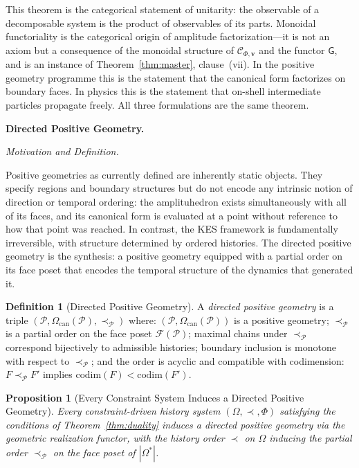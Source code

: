 \documentclass[11pt]{article}
\theoremstyle{plain}
\newtheorem{proposition}[theorem]{Proposition}
\theoremstyle{definition}
\newtheorem{definition}[theorem]{Definition}
\theoremstyle{remark}
\newcommand{\Phif}{\Phi}
\newcommand{\OmKS}{\Omega}
\newcommand{\CF}{\Omega_{\mathrm{can}}}
\newcommand{\Ccat}{\mathcal{C}_{\Phi,\mathbf{v}}}
\newcommand{\Gfun}{\mathsf{G}}
\begin{document}
This theorem is the categorical statement of unitarity: the observable of a decomposable system is the product of observables of its parts. Monoidal functoriality is the categorical origin of amplitude factorization---it is not an axiom but a consequence of the monoidal structure of $\Ccat$ and the functor $\Gfun$, and is an instance of Theorem~\ref{thm:master}, clause~(vii). In the positive geometry programme this is the statement that the canonical form factorizes on boundary faces. In physics this is the statement that on-shell intermediate particles propagate freely. All three formulations are the same theorem.

\bigskip\noindent\textbf{Directed Positive Geometry.}
\label{sec:directed}

\medskip\noindent\textit{Motivation and Definition.}

Positive geometries as currently defined are inherently static objects. They specify regions and boundary structures but do not encode any intrinsic notion of direction or temporal ordering: the amplituhedron exists simultaneously with all of its faces, and its canonical form is evaluated at a point without reference to how that point was reached. In contrast, the KES framework is fundamentally irreversible, with structure determined by ordered histories. The directed positive geometry is the synthesis: a positive geometry equipped with a partial order on its face poset that encodes the temporal structure of the dynamics that generated it.

\begin{definition}[Directed Positive Geometry]
\label{def:dpg}
A \emph{directed positive geometry} is a triple $(\mathcal{P}, \CF(\mathcal{P}), \prec_{\mathcal{P}})$ where: $(\mathcal{P}, \CF(\mathcal{P}))$ is a positive geometry; $\prec_{\mathcal{P}}$ is a partial order on the face poset $\mathcal{F}(\mathcal{P})$; maximal chains under $\prec_{\mathcal{P}}$ correspond bijectively to admissible histories; boundary inclusion is monotone with respect to $\prec_{\mathcal{P}}$; and the order is acyclic and compatible with codimension: $F \prec_{\mathcal{P}} F'$ implies $\mathrm{codim}(F) < \mathrm{codim}(F')$.
\end{definition}

\begin{proposition}[Every Constraint System Induces a Directed Positive Geometry]
Every constraint-driven history system $(\OmKS, \prec, \Phif)$ satisfying the conditions of Theorem~\ref{thm:duality} induces a directed positive geometry via the geometric realization functor, with the history order $\prec$ on $\OmKS$ inducing the partial order $\prec_{\mathcal{P}}$ on the face poset of $|\OmKS^*|$.
\end{proposition}
\end{document}
